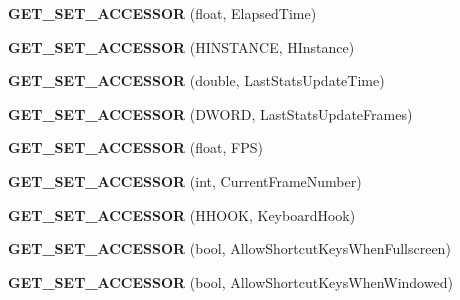 \begin{DoxyCompactItemize}
\item 
\hypertarget{class_d_x_u_t_state_a648316ed44cdbdbe6b7e4e7edb4baf84}{{\bfseries G\+E\+T\+\_\+\+S\+E\+T\+\_\+\+A\+C\+C\+E\+S\+S\+O\+R} (float, Elapsed\+Time)}\label{class_d_x_u_t_state_a648316ed44cdbdbe6b7e4e7edb4baf84}

\item 
\hypertarget{class_d_x_u_t_state_a120cbee424cd8d4027ccb673a54dac45}{{\bfseries G\+E\+T\+\_\+\+S\+E\+T\+\_\+\+A\+C\+C\+E\+S\+S\+O\+R} (H\+I\+N\+S\+T\+A\+N\+C\+E, H\+Instance)}\label{class_d_x_u_t_state_a120cbee424cd8d4027ccb673a54dac45}

\item 
\hypertarget{class_d_x_u_t_state_abaf158a9b3da0ca285351bc1734ce0bc}{{\bfseries G\+E\+T\+\_\+\+S\+E\+T\+\_\+\+A\+C\+C\+E\+S\+S\+O\+R} (double, Last\+Stats\+Update\+Time)}\label{class_d_x_u_t_state_abaf158a9b3da0ca285351bc1734ce0bc}

\item 
\hypertarget{class_d_x_u_t_state_ac41d64d5d6c5e2e4581d7691de699813}{{\bfseries G\+E\+T\+\_\+\+S\+E\+T\+\_\+\+A\+C\+C\+E\+S\+S\+O\+R} (D\+W\+O\+R\+D, Last\+Stats\+Update\+Frames)}\label{class_d_x_u_t_state_ac41d64d5d6c5e2e4581d7691de699813}

\item 
\hypertarget{class_d_x_u_t_state_accc97e39d9e6ed9d7bf119742bc80a33}{{\bfseries G\+E\+T\+\_\+\+S\+E\+T\+\_\+\+A\+C\+C\+E\+S\+S\+O\+R} (float, F\+P\+S)}\label{class_d_x_u_t_state_accc97e39d9e6ed9d7bf119742bc80a33}

\item 
\hypertarget{class_d_x_u_t_state_acecf3e26898c43cf90661b119dd6aa63}{{\bfseries G\+E\+T\+\_\+\+S\+E\+T\+\_\+\+A\+C\+C\+E\+S\+S\+O\+R} (int, Current\+Frame\+Number)}\label{class_d_x_u_t_state_acecf3e26898c43cf90661b119dd6aa63}

\item 
\hypertarget{class_d_x_u_t_state_a6db584f64504aa1868d15b3a144d2097}{{\bfseries G\+E\+T\+\_\+\+S\+E\+T\+\_\+\+A\+C\+C\+E\+S\+S\+O\+R} (H\+H\+O\+O\+K, Keyboard\+Hook)}\label{class_d_x_u_t_state_a6db584f64504aa1868d15b3a144d2097}

\item 
\hypertarget{class_d_x_u_t_state_a240e919faaf9d6d4e7ebeb09305c971a}{{\bfseries G\+E\+T\+\_\+\+S\+E\+T\+\_\+\+A\+C\+C\+E\+S\+S\+O\+R} (bool, Allow\+Shortcut\+Keys\+When\+Fullscreen)}\label{class_d_x_u_t_state_a240e919faaf9d6d4e7ebeb09305c971a}

\item 
\hypertarget{class_d_x_u_t_state_ac133142352b310bb0ec40522f02c34c2}{{\bfseries G\+E\+T\+\_\+\+S\+E\+T\+\_\+\+A\+C\+C\+E\+S\+S\+O\+R} (bool, Allow\+Shortcut\+Keys\+When\+Windowed)}\label{class_d_x_u_t_state_ac133142352b310bb0ec40522f02c34c2}


\end{DoxyCompactItemize}
